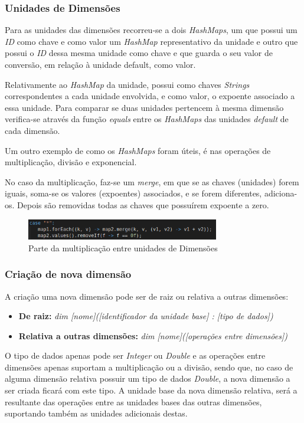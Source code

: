 \documentclass[10pt,portuguese]{article}
\begin{document}
\subsubsection{Unidades de Dimensões}
\par Para as unidades das dimensões recorreu-se a dois \emph{HashMaps}, um que possui um \emph{ID} como chave e como valor um \emph{HashMap} representativo da unidade e outro que possui o \emph{ID} dessa mesma unidade como chave e que guarda o seu valor de conversão, em relação à unidade default, como valor.
\par Relativamente ao \emph{HashMap} da unidade, possui como chaves \emph{Strings} correspondentes a cada unidade envolvida, e como valor, o expoente associado a essa unidade. Para comparar se duas unidades pertencem à mesma dimensão verifica-se através da função \emph{equals} entre os \emph{HashMaps} das unidades \emph{default} de cada dimensão.
\par Um outro exemplo de como os \emph{HashMaps} foram úteis, é nas operações de multiplicação, divisão e exponencial.
\par No caso da multiplicação, faz-se um \emph{merge}, em que se as chaves (unidades) forem iguais, soma-se os valores (expoentes) associados, e se forem diferentes, adiciona-os. Depois são removidas todas as chaves que possuírem expoente a zero. 
\begin{figure}[h]
\centering
\includegraphics[width=0.75\textwidth]{images/unknown_2.png}
\caption{Parte da multiplicação entre unidades de Dimensões}
\end{figure}
\subsubsection{Criação de nova dimensão}
\par A criação uma nova dimensão pode ser de raiz ou relativa a outras dimensões:

\begin{itemize}
    \item \textbf{De raiz:} \textit{dim [nome]([identificador da unidade base] : [tipo de dados])}
    \item \textbf{Relativa a outras dimensões:} \textit{dim [nome]([operações entre dimensões])}
\end{itemize}

\par O tipo de dados apenas pode ser \textit{Integer} ou \textit{Double} e as operações entre dimensões apenas suportam a multiplicação ou a divisão, sendo que, no caso de alguma dimensão relativa possuir um tipo de dados \textit{Double}, a nova dimensão a ser criada ficará com este tipo. A unidade base da nova dimensão relativa, será a resultante das operações entre as unidades bases das outras dimensões, suportando também as unidades adicionais destas.
\end{document}
